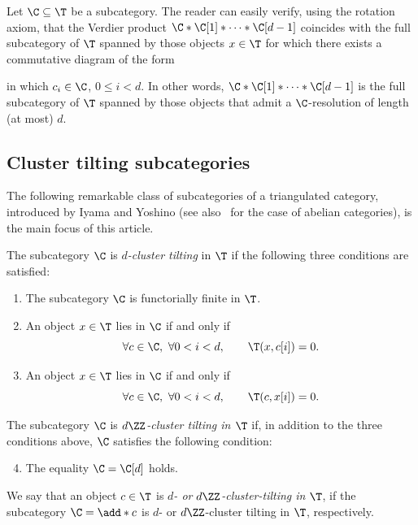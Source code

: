 \documentclass[a4paper]{amsart}
\begin{document}
\begin{example}\label{ex:nested-triangles}
  Let $\C\subseteq\T$ be a subcategory. The reader can easily verify, using the
  rotation axiom, that the Verdier product $\C*\C[1]*\cdots*\C[d-1]$ coincides
  with the full subcategory of $\T$ spanned by those objects $x\in\T$ for which
  there exists a commutative diagram of the form
  \begin{center}
  \end{center}
  in which $c_i\in\C$, $0\leq i<d$. In other words, $\C*\C[1]*\cdots*\C[d-1]$ is
  the full subcategory of $\T$ spanned by those objects that admit a
  $\C$-resolution of length (at most) $d$.
\end{example}

\subsection{Cluster tilting subcategories}

The following remarkable class of subcategories of a triangulated category,
introduced by Iyama and Yoshino (see also~\cite{Iya07a,Iya07,IJ17} for the case
of abelian categories), is the main focus of this article.

\begin{definition}[{\cite[Sec.~3]{IY08}}]
  \label{def:d-CT_dZ-CT}
  The subcategory $\C$ is \emph{$d$-cluster tilting} in $\T$ if the following
  three conditions are satisfied:
  \begin{enumerate}
  \item The subcategory $\C$ is functorially finite in $\T$.
  \item An object $x\in\T$ lies in $\C$ if and only if
    \[
      \forall c\in\C,\ \forall 0<i<d,\qquad \T(x,c[i])=0.
    \]
  \item An object $x\in\T$ lies in $\C$ if and only if
    \[
      \forall c\in\C,\ \forall 0<i<d,\qquad \T(c,x[i])=0.
    \]
  \end{enumerate}
  The subcategory $\C$ is \emph{$d\ZZ$-cluster tilting in $\T$} if, in addition
  to the three conditions above, $\C$ satisfies the following condition:
  \begin{enumerate}
    \setcounter{enumi}{3}
  \item The equality $\C=\C[d]$ holds.
  \end{enumerate}
  We say that an object $c\in\T$ is \emph{$d$- or $d\ZZ$-cluster-tilting in
    $\T$}, if the subcategory $\C=\add*{c}$ is $d$- or $d\ZZ$-cluster tilting in
  $\T$, respectively.
\end{definition}
\end{document}
